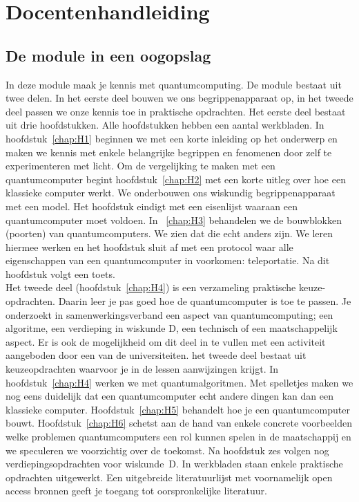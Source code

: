 \documentclass[../../main.tex]{subfiles}
\begin{document}
\onlyinsubfile{
}
\notinsubfile{}
\chapter{Docentenhandleiding}

\section{De module in een oogopslag}\label{chap:Hoog}
In deze module maak je kennis met quantumcomputing. De module bestaat uit twee delen. In het eerste deel bouwen we ons begrippenapparaat op, in het tweede deel passen we onze kennis toe in praktische opdrachten. Het eerste deel bestaat uit drie hoofdstukken. Alle hoofdstukken hebben een aantal werkbladen. In hoofdstuk~\ref{chap:H1} beginnen we met een korte inleiding op het onderwerp en maken we kennis met enkele belangrijke begrippen en fenomenen door zelf te experimenteren met licht. Om de vergelijking te maken met een quantumcomputer begint hoofdstuk~\ref{chap:H2} met een korte uitleg over hoe een klassieke computer werkt. We onderbouwen ons wiskundig begrippenapparaat met een model. Het hoofdstuk eindigt met een eisenlijst waaraan een quantumcomputer moet voldoen. In ~\ref{chap:H3} behandelen we de bouwblokken (poorten) van quantumcomputers. We zien dat die echt anders zijn. We leren hiermee werken en het hoofdstuk sluit af met een protocol waar alle eigenschappen van een quantumcomputer in voorkomen: teleportatie. Na dit hoofdstuk volgt een toets. \\
Het tweede deel (hoofdstuk~\ref{chap:H4}) is een verzameling praktische keuze-opdrachten. Daarin leer je pas goed hoe de quantumcomputer is toe te passen. Je onderzoekt in samenwerkingsverband een aspect van quantumcomputing; een algoritme, een verdieping in wiskunde D, een technisch of een maatschappelijk aspect. Er is ook de mogelijkheid om dit deel in te vullen met een activiteit aangeboden door een van de universiteiten. 
\iffalse
het tweede deel bestaat uit keuzeopdrachten waarvoor je in de lessen aanwijzingen krijgt. In hoofdstuk~\ref{chap:H4} werken we met quantumalgoritmen. Met spelletjes maken we nog eens duidelijk dat een quantumcomputer echt andere dingen kan dan een klassieke computer. Hoofdstuk~\ref{chap:H5} behandelt hoe je een quantumcomputer bouwt. Hoofdstuk~\ref{chap:H6} schetst aan de hand van enkele concrete voorbeelden welke problemen quantumcomputers een rol kunnen spelen in de maatschappij en we speculeren we voorzichtig over de toekomst. Na hoofdstuk zes volgen nog verdiepingsopdrachten voor wiskunde~D. In werkbladen staan enkele praktische opdrachten uitgewerkt. Een uitgebreide literatuurlijst met voornamelijk open access bronnen geeft je toegang tot oorspronkelijke literatuur. 
\end{document}
